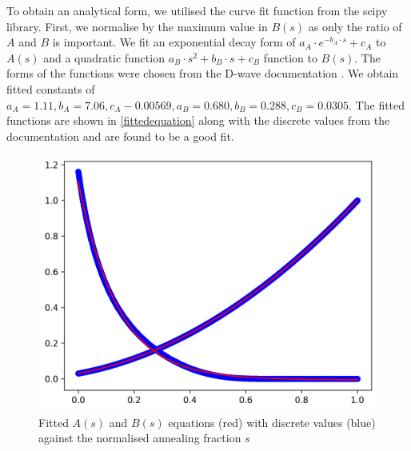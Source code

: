 To obtain an analytical form, we utilised the curve fit function from the scipy library. First, we normalise by the maximum value in $B(s)$ as only the ratio of $A$ and $B$ is important. We fit an exponential decay form of $a_{A}\cdot e^{-b_{A}\cdot s} + c_{A}$ to $A(s)$ and a quadratic function $a_{B} \cdot s^2 + b_{B} \cdot s + c_{B}$ function to $B(s)$. The forms of the functions were chosen from the D-wave documentation \cite{dwavefunctions}. We obtain fitted constants of $a_{A}=1.11, b_{A} = 7.06, c_A-0.00569, a_B = 0.680, b_B = 0.288, c_B = 0.0305$. The fitted functions are shown in \autoref{fittedequation} along with the discrete values from the documentation and are found to be a good fit.
\begin{figure}[!h]
    \centering
    \includegraphics[width=0.8\linewidth]{images/fitted.png}
    \caption{Fitted $A(s)$ and $B(s)$ equations (red) with discrete values (blue) against the normalised annealing fraction $s$}
    \label{fittedequation}
\end{figure}